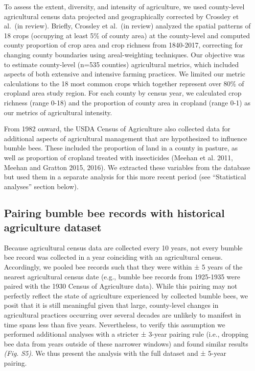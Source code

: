 \documentclass[11pt,]{article}
\begin{document}
To assess the extent, diversity, and intensity of agriculture, we used
county-level agricultural census data projected and geographically
corrected by Crossley et al.~(in review). Briefly, Crossley et al.~(in
review) analyzed the spatial patterns of 18 crops (occupying at least
5\% of county area) at the county-level and computed county proportion
of crop area and crop richness from 1840-2017, correcting for changing
county boundaries using areal-weighting techniques. Our objective was to
estimate county-level (n=535 counties) agricultural metrics, which
included aspects of both extensive and intensive farming practices. We
limited our metric calculations to the 18 most common crops which
together represent over 80\% of cropland area study region. For each
county by census year, we calculated crop richness (range 0-18) and the
proportion of county area in cropland (range 0-1) as our metrics of
agricultural intensity.

From 1982 onward, the USDA Census of Agriculture also collected data for
additional aspects of agricultural management that are hypothesized to
influence bumble bees. These included the proportion of land in a county
in pasture, as well as proportion of cropland treated with insecticides
(Meehan et al. 2011, Meehan and Gratton 2015, 2016). We extracted these
variables from the database but used them in a separate analysis for
this more recent period (see ``Statistical analyses'' section below).

\hypertarget{pairing-bumble-bee-records-with-historical-agriculture-dataset}{%
\subsection{Pairing bumble bee records with historical agriculture
dataset}\label{pairing-bumble-bee-records-with-historical-agriculture-dataset}}

Because agricultural census data are collected every 10 years, not every
bumble bee record was collected in a year coinciding with an
agricultural census. Accordingly, we pooled bee records such that they
were within ± 5 years of the nearest agricultural census date (e.g.,
bumble bee records from 1925-1935 were paired with the 1930 Census of
Agriculture data). While this pairing may not perfectly reflect the
state of agriculture experienced by collected bumble bees, we posit that
it is still meaningful given that large, county-level changes in
agricultural practices occurring over several decades are unlikely to
manifest in time spans less than five years. Nevertheless, to verify
this assumption we performed additional analyses with a stricter ±
3-year pairing rule (i.e., dropping bee data from years outside of these
narrower windows) and found similar results \emph{(Fig. S5)}. We thus
present the analysis with the full dataset and ± 5-year pairing.
\end{document}
